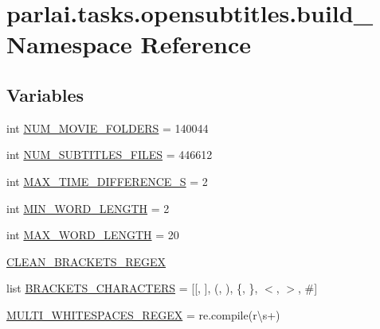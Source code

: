 \hypertarget{namespaceparlai_1_1tasks_1_1opensubtitles_1_1build__2018}{}\section{parlai.\+tasks.\+opensubtitles.\+build\+\_ Namespace Reference}
\label{namespaceparlai_1_1tasks_1_1opensubtitles_1_1build__2018}
\subsection*{Variables}
\begin{DoxyCompactItemize}
\item 
int \hyperlink{namespaceparlai_1_1tasks_1_1opensubtitles_1_1build__2018_a169e02db9ede8d042f030a1900c2d2a5}{N\+U\+M\+\_\+\+M\+O\+V\+I\+E\+\_\+\+F\+O\+L\+D\+E\+RS} = 140044
\item 
int \hyperlink{namespaceparlai_1_1tasks_1_1opensubtitles_1_1build__2018_a579901f247e6d284a7a3fa3895352a3b}{N\+U\+M\+\_\+\+S\+U\+B\+T\+I\+T\+L\+E\+S\+\_\+\+F\+I\+L\+ES} = 446612
\item 
int \hyperlink{namespaceparlai_1_1tasks_1_1opensubtitles_1_1build__2018_a8e950097756090929c6d2d1c91e24f7a}{M\+A\+X\+\_\+\+T\+I\+M\+E\+\_\+\+D\+I\+F\+F\+E\+R\+E\+N\+C\+E\+\_\+S} = 2
\item 
int \hyperlink{namespaceparlai_1_1tasks_1_1opensubtitles_1_1build__2018_a2127a01f8b5dda1504519a67464ac842}{M\+I\+N\+\_\+\+W\+O\+R\+D\+\_\+\+L\+E\+N\+G\+TH} = 2
\item 
int \hyperlink{namespaceparlai_1_1tasks_1_1opensubtitles_1_1build__2018_ac9c453829b8d7a0a33d4dce0a00d8158}{M\+A\+X\+\_\+\+W\+O\+R\+D\+\_\+\+L\+E\+N\+G\+TH} = 20
\item 
\hyperlink{namespaceparlai_1_1tasks_1_1opensubtitles_1_1build__2018_aa6c0d72c5f5b4f7959fa467bf88ad85c}{C\+L\+E\+A\+N\+\_\+\+B\+R\+A\+C\+K\+E\+T\+S\+\_\+\+R\+E\+G\+EX}
\item 
list \hyperlink{namespaceparlai_1_1tasks_1_1opensubtitles_1_1build__2018_a66bc46854a80d30ff62aa64dcaa6d254}{B\+R\+A\+C\+K\+E\+T\+S\+\_\+\+C\+H\+A\+R\+A\+C\+T\+E\+RS} = \mbox{[}\textquotesingle{}\mbox{[}\textquotesingle{}, \textquotesingle{}\mbox{]}\textquotesingle{}, \textquotesingle{}(\textquotesingle{}, \textquotesingle{})\textquotesingle{}, \textquotesingle{}\{\textquotesingle{}, \textquotesingle{}\}\textquotesingle{}, \textquotesingle{}$<$\textquotesingle{}, \textquotesingle{}$>$\textquotesingle{}, \textquotesingle{}\#\textquotesingle{}\mbox{]}
\item 
\hyperlink{namespaceparlai_1_1tasks_1_1opensubtitles_1_1build__2018_a5c1b6cbec3209a9a71111847ff7244f4}{M\+U\+L\+T\+I\+\_\+\+W\+H\+I\+T\+E\+S\+P\+A\+C\+E\+S\+\_\+\+R\+E\+G\+EX} = re.\+compile(r\textquotesingle{}\textbackslash{}s+\textquotesingle{})
\end{DoxyCompactItemize}


